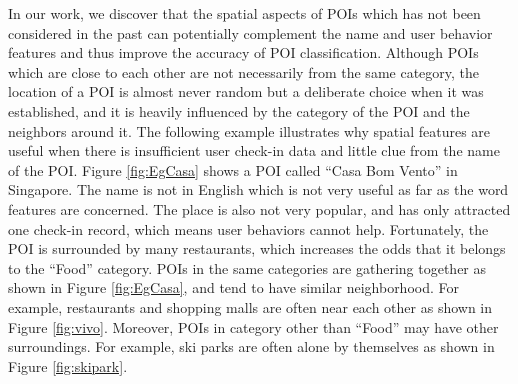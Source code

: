 
In our work, we discover that the spatial aspects of POIs which
has not been considered in the past can potentially complement
the name and user behavior features and thus improve the accuracy of POI
classification.
Although POIs which are close to each other are not necessarily from the same
category, the location of a POI is almost never random
but a deliberate choice when it was established, and it is
heavily influenced by the category of the POI and the neighbors around it.
The following example illustrates why spatial features are useful
when there is insufficient user check-in data and little clue from the
name of the POI. Figure \ref{fig:EgCasa} shows a POI
called ``Casa Bom Vento'' in Singapore. The name is not in English
which is not very useful as far as the word features are concerned.
The place is also not very popular, and has only attracted one check-in record,
which means user behaviors cannot help.
Fortunately, the POI is surrounded by many restaurants, which increases
the odds that it belongs to the ``Food'' category.
POIs in the same categories are gathering together as shown
in Figure \ref{fig:EgCasa}, and tend to have
similar neighborhood. For example, restaurants and shopping malls are
often near each other as shown in Figure \ref{fig:vivo}. 
Moreover, POIs in category other than ``Food'' may have 
other surroundings.
For example, ski parks are often alone by themselves as shown in Figure \ref{fig:skipark}.

